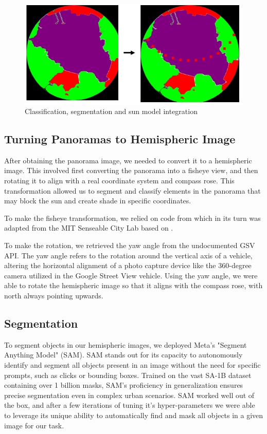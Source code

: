 \documentclass[nohyperref]{article}
\theoremstyle{plain}
\theoremstyle{definition}
\theoremstyle{remark}
\begin{document}
\begin{figure}[ht]
\begin{center}
\centerline{\includegraphics[width=\columnwidth]{pipeline-2.png}}
\caption{Classification, segmentation and sun model integration}
\end{center}
\vskip -0.2in
\end{figure}

\subsection{Turning Panoramas to Hemispheric Image}
After obtaining the panorama image, we needed to convert it to a hemispheric image. This involved first converting the panorama into a fisheye view, and then rotating it to align with a real coordinate system and compass rose. This transformation allowed us to segment and classify elements in the panorama that may block the sun and create shade in specific coordinates.

To make the fisheye transformation, we relied on code from \citet{li2019pedestrian} which in its turn was adapted from the MIT Senseable City Lab based on \citet{rs9050411}.

To make the rotation, we retrieved the yaw angle from the undocumented GSV API. The yaw angle refers to the rotation around the vertical axis of a vehicle, altering the horizontal alignment of a photo capture device like the 360-degree camera utilized in the Google Street View vehicle. Using the yaw angle, we were able to rotate the hemispheric image so that it aligns with the compass rose, with north always pointing upwards.

\subsection{Segmentation}
To segment objects in our hemispheric images, we deployed Meta's "Segment Anything Model" (SAM). SAM stands out for its capacity to autonomously identify and segment all objects present in an image without the need for specific prompts, such as clicks or bounding boxes. Trained on the vast SA-1B dataset containing over 1 billion masks, SAM's proficiency in generalization ensures precise segmentation even in complex urban scenarios. SAM worked well out of the box, and after a few iterations of tuning it's hyper-parameters we were able to leverage its unique ability to automatically find and mask all objects in a given image for our task.
\end{document}
